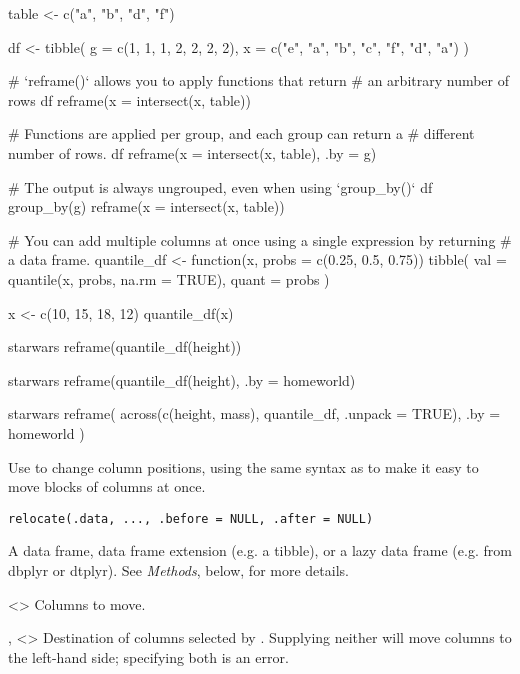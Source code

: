 \documentclass[a4paper]{book}
\begin{document}
%
\begin{Examples}
\begin{ExampleCode}
table <- c("a", "b", "d", "f")

df <- tibble(
  g = c(1, 1, 1, 2, 2, 2, 2),
  x = c("e", "a", "b", "c", "f", "d", "a")
)

# `reframe()` allows you to apply functions that return
# an arbitrary number of rows
df %
  reframe(x = intersect(x, table))

# Functions are applied per group, and each group can return a
# different number of rows.
df %
  reframe(x = intersect(x, table), .by = g)

# The output is always ungrouped, even when using `group_by()`
df %
  group_by(g) %
  reframe(x = intersect(x, table))

# You can add multiple columns at once using a single expression by returning
# a data frame.
quantile_df <- function(x, probs = c(0.25, 0.5, 0.75)) {
  tibble(
    val = quantile(x, probs, na.rm = TRUE),
    quant = probs
  )
}

x <- c(10, 15, 18, 12)
quantile_df(x)

starwars %
  reframe(quantile_df(height))

starwars %
  reframe(quantile_df(height), .by = homeworld)

starwars %
  reframe(
    across(c(height, mass), quantile_df, .unpack = TRUE),
    .by = homeworld
  )
\end{ExampleCode}
\end{Examples}
%
\begin{Description}
Use  to change column positions, using the same syntax as
 to make it easy to move blocks of columns at once.
\end{Description}
%
\begin{Usage}
\begin{verbatim}
relocate(.data, ..., .before = NULL, .after = NULL)
\end{verbatim}
\end{Usage}
%
\begin{Arguments}
\begin{ldescription}
\item[\code{.data}] A data frame, data frame extension (e.g. a tibble), or a
lazy data frame (e.g. from dbplyr or dtplyr). See \emph{Methods}, below, for
more details.

\item[\code{...}] <> Columns to move.

\item[\code{.before}, \code{.after}] <> Destination of
columns selected by . Supplying neither will move columns to the
left-hand side; specifying both is an error.
\end{ldescription}
\end{Arguments}
\end{document}
